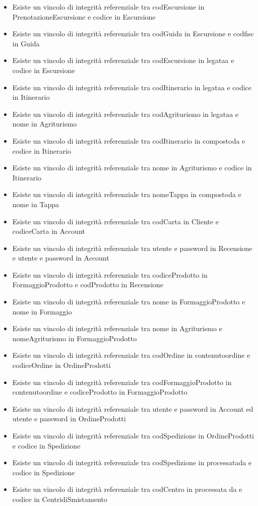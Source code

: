 \documentclass[12pt,a4paper]{article}
\begin{document}
\begin{itemize}
   \item Esiste un vincolo di integrità referenziale tra codEscursione in PrenotazioneEscursione e codice in Escursione 
   \item Esiste un vincolo di integrità referenziale tra codGuida in Escursione e codfisc in Guida
   \item Esiste un vincolo di integrità referenziale tra codEscursione in legataa e codice in Escursione
   \item Esiste un vincolo di integrità referenziale tra codItinerario in legataa e codice in Itinerario
   \item Esiste un vincolo di integrità referenziale tra codAgriturismo in legataa e nome in Agriturismo
   \item Esiste un vincolo di integrità referenziale tra codItinerario in compostoda e codice in Itinerario
   \item Esiste un vincolo di integrità referenziale tra nome in Agriturismo e codice in Itinerario
   \item Esiste un vincolo di integrità referenziale tra nomeTappa in compostoda e nome in Tappa
   \item Esiste un vincolo di integrità referenziale tra codCarta in Cliente e codiceCarta in Account
   \item Esiste un vincolo di integrità referenziale tra utente e password in Recensione e utente e password in Account
   \item Esiste un vincolo di integrità referenziale tra codiceProdotto in FormaggioProdotto e codProdotto in Recensione
   \item Esiste un vincolo di integrità referenziale tra nome in FormaggioProdotto e nome in Formaggio
   \item Esiste un vincolo di integrità referenziale tra nome in Agriturismo e nomeAgriturismo in FormaggioProdotto
   \item Esiste un vincolo di integrità referenziale tra codOrdine in contenutoordine e codiceOrdine in OrdineProdotti
   \item Esiste un vincolo di integrità referenziale tra codFormaggioProdotto in contenutoordine e codiceProdotto in FormaggioProdotto
   \item Esiste un vincolo di integrità referenziale tra utente e password in Account ed utente e password in OrdineProdotti
   \item Esiste un vincolo di integrità referenziale tra codSpedizione in OrdineProdotti e codice in Spedizione
   \item Esiste un vincolo di integrità referenziale tra codSpedizione in processatada e codice in Spedizione
   \item Esiste un vincolo di integrità referenziale tra codCentro in processata da e codice in CentridiSmistamento
\end{itemize}     
   
\end{document}
